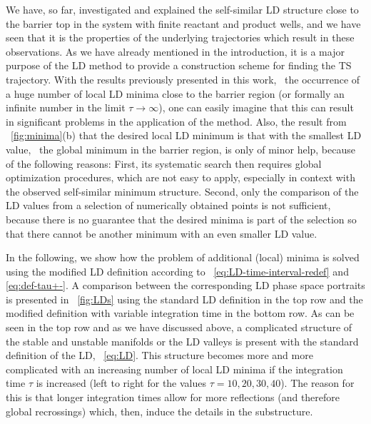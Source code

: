 \documentclass[aip,reprint,jcp,amsmath,amssymb,superscriptaddress,floatfix]{revtex4-1}
\begin{document}
We have, so far, investigated and explained the self-similar LD structure close 
to the barrier top in the system with finite reactant and product wells, and we 
have seen that it is the properties of the underlying trajectories which result 
in these observations.
As we have already mentioned in the introduction, it is a major purpose of the 
LD method to provide a construction scheme for finding the TS trajectory.
With the results previously presented in this work, 
\ie~the occurrence of a huge 
number of local LD minima close to the barrier region (or formally an infinite 
number in the limit $\tau\to\infty$), one can easily imagine that this can 
result in significant problems in the application of the method.
% 
Also, the result from \FIG~\ref{fig:minima}(b) that the desired local LD 
minimum is that with the smallest LD value, \ie~the global minimum in the 
barrier region, is only of minor help, because of the following reasons:
First, its systematic search then requires global optimization procedures, 
which are not easy to apply, especially in context with the observed 
self-similar minimum structure.
Second, only the comparison of the LD values from a selection of numerically 
obtained points is not sufficient, because there is no guarantee that the 
desired minima is part of the selection so that there cannot be another minimum 
with an even smaller LD value.

In the following, we show how the problem of additional (local) 
minima is solved using the modified LD definition according to 
\EQS~\eqref{eq:LD-time-interval-redef} and \eqref{eq:def-tau+-}.
% 
A comparison between the corresponding LD phase space portraits is presented in 
\FIG~\ref{fig:LDs} using the standard LD definition in the top row and the 
modified definition with variable integration time in the bottom row.
As can be seen in the top row and as we have discussed above, a complicated 
structure of the stable and unstable manifolds or the LD valleys is present with 
the standard definition of the LD, \EQ~\eqref{eq:LD}.
This structure becomes more and more complicated with an increasing number of 
local LD minima if the integration time $\tau$ is increased (left to right for 
the values $\tau=10, 20, 30, 40$). 
The reason for this is that longer integration times allow for more reflections 
(and therefore global recrossings)
which, then, induce the details in the substructure.
\end{document}
